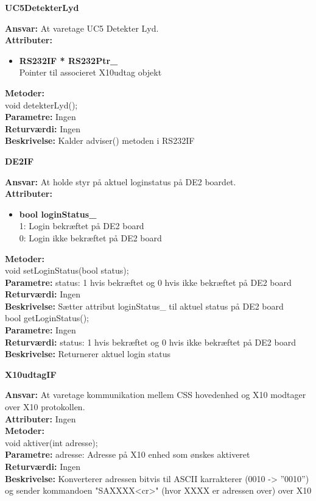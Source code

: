 %
%
{\centering
\textbf{UC5DetekterLyd}\par
}
\textbf{Ansvar:} At varetage UC5 Detekter Lyd. \\
\textbf{Attributer:}
\begin{itemize}
	\item \textbf{RS232IF * RS232Ptr\_} \\
	Pointer til associeret X10udtag objekt
\end{itemize}
\textbf{Metoder:} \\
void detekterLyd(); \\
\textbf{Parametre:} Ingen \\
\textbf{Returværdi:} Ingen \\
\textbf{Beskrivelse:} Kalder adviser() metoden i RS232IF \\

%
%
{\centering
\textbf{DE2IF}\par
}
\textbf{Ansvar:} At holde styr på aktuel loginstatus på DE2 boardet. \\
\textbf{Attributer:}
\begin{itemize}
	\item \textbf{bool loginStatus\_} \\
	1: Login bekræftet på DE2 board \\
	0: Login ikke bekræftet på DE2 board
\end{itemize}

\textbf{Metoder:} \\
void setLoginStatus(bool status); \\
\textbf{Parametre:} status: 1 hvis bekræftet og 0 hvis ikke bekræftet på DE2 board \\
\textbf{Returværdi:} Ingen \\
\textbf{Beskrivelse:} Sætter attribut loginStatus\_ til aktuel status på DE2 board \\

bool getLoginStatus(); \\
\textbf{Parametre:} Ingen \\
\textbf{Returværdi:} status: 1 hvis bekræftet og 0 hvis ikke bekræftet på DE2 board \\
\textbf{Beskrivelse:} Returnerer aktuel login status \\

%
%
{\centering
\textbf{X10udtagIF}\par
}
\textbf{Ansvar:} At varetage kommunikation mellem CSS hovedenhed og X10 modtager over X10 protokollen. \\
\textbf{Attributer:} Ingen \\
\textbf{Metoder:} \\
void aktiver(int adresse); \\
\textbf{Parametre:} adresse: Adresse på X10 enhed som ønskes aktiveret \\
\textbf{Returværdi:} Ingen \\
\textbf{Beskrivelse:} Konverterer adressen bitvis til ASCII karrakterer (0010 -> ''0010'') og sender kommandoen "SAXXXX<cr>" (hvor XXXX er adressen over) over X10 \\

